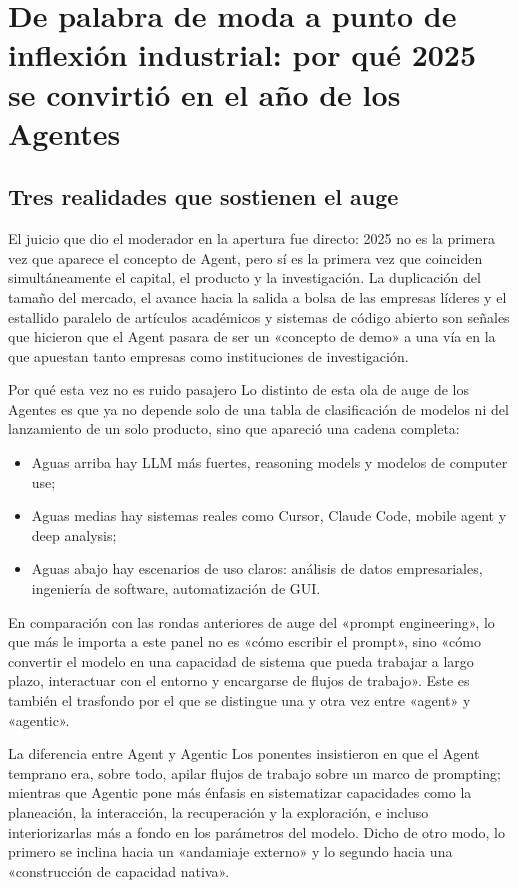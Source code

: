 \section{De palabra de moda a punto de inflexión industrial: por qué 2025 se convirtió en el año de los Agentes}

\subsection{Tres realidades que sostienen el auge}
El juicio que dio el moderador en la apertura fue directo: 2025 no es la primera vez que aparece el concepto de Agent, pero sí es la primera vez que coinciden simultáneamente el capital, el producto y la investigación. La duplicación del tamaño del mercado, el avance hacia la salida a bolsa de las empresas líderes y el estallido paralelo de artículos académicos y sistemas de código abierto son señales que hicieron que el Agent pasara de ser un «concepto de demo» a una vía en la que apuestan tanto empresas como instituciones de investigación.

\begin{importantbox}{Por qué esta vez no es ruido pasajero}
Lo distinto de esta ola de auge de los Agentes es que ya no depende solo de una tabla de clasificación de modelos ni del lanzamiento de un solo producto, sino que apareció una cadena completa:
\begin{itemize}
  \item Aguas arriba hay LLM más fuertes, reasoning models y modelos de computer use;
  \item Aguas medias hay sistemas reales como Cursor, Claude Code, mobile agent y deep analysis;
  \item Aguas abajo hay escenarios de uso claros: análisis de datos empresariales, ingeniería de software, automatización de GUI.
\end{itemize}
\end{importantbox}

En comparación con las rondas anteriores de auge del «prompt engineering», lo que más le importa a este panel no es «cómo escribir el prompt», sino «cómo convertir el modelo en una capacidad de sistema que pueda trabajar a largo plazo, interactuar con el entorno y encargarse de flujos de trabajo». Este es también el trasfondo por el que se distingue una y otra vez entre «agent» y «agentic».

\begin{knowledgebox}{La diferencia entre Agent y Agentic}
Los ponentes insistieron en que el Agent temprano era, sobre todo, apilar flujos de trabajo sobre un marco de prompting; mientras que Agentic pone más énfasis en sistematizar capacidades como la planeación, la interacción, la recuperación y la exploración, e incluso interiorizarlas más a fondo en los parámetros del modelo. Dicho de otro modo, lo primero se inclina hacia un «andamiaje externo» y lo segundo hacia una «construcción de capacidad nativa».
\end{knowledgebox}

